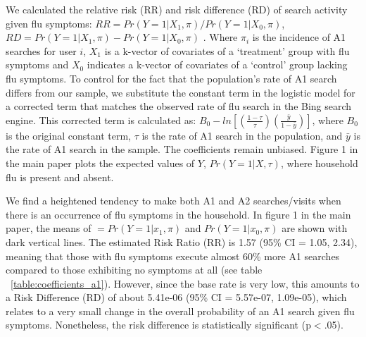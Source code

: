 \documentclass[12pt]{article}
\begin{document}
We calculated the relative risk (RR) and risk difference (RD) of search activity given flu symptoms: $ RR = Pr(Y=1|X_1, \pi) / Pr(Y=1|X_0, \pi) $, $ RD = Pr(Y=1|X_1, \pi) - Pr(Y=1|X_0, \pi) $ \citep{king_and_zeng_2001}. Where $\pi_i$ is the incidence of A1 searches for user $i$, $X_1$ is a k-vector of covariates of a `treatment' group with flu symptoms and $X_0$ indicates a k-vector of covariates of a `control' group lacking flu symptoms. To control for the fact that the population's rate of A1 search differs from our sample, we substitute the constant term in the logistic model for a corrected term that matches the observed rate of flu search in the Bing search engine. This corrected term is calculated as: $B_0 - ln[ (\frac{1-\tau}{\tau}) (\frac{\bar{y}}{1-\bar{y}}) ]$, where $B_0$ is the original constant term, $\tau$ is the rate of A1 search in the population, and $\bar{y}$ is the rate of A1 search in the sample. The coefficients remain unbiased. Figure 1 in the main paper plots the expected values of $Y$, $Pr(Y=1|X, \tau)$, where household flu is present and absent.



We find a heightened tendency to make both A1 and A2  searches/visits when there is an occurrence of flu symptoms in the household. In figure 1 in the main paper, the means of $ = Pr(Y=1|x_1, \pi)$ and $ Pr(Y=1|x_0, \pi) $ are shown with dark vertical lines. The estimated Risk Ratio (RR) is 1.57 (95\% CI = 1.05, 2.34), meaning that those with flu symptoms execute almost 60\% more A1 searches compared to those exhibiting no symptoms at all (see table ~\ref{table:coefficients_a1}). However, since the base rate is very low, this amounts to a Risk Difference (RD) of about 5.41e-06 (95\% CI = 5.57e-07, 1.09e-05), which relates to a very small change in the overall probability of an A1 search given flu symptoms. Nonetheless, the risk difference is statistically significant (p$<$.05).

\end{document}
